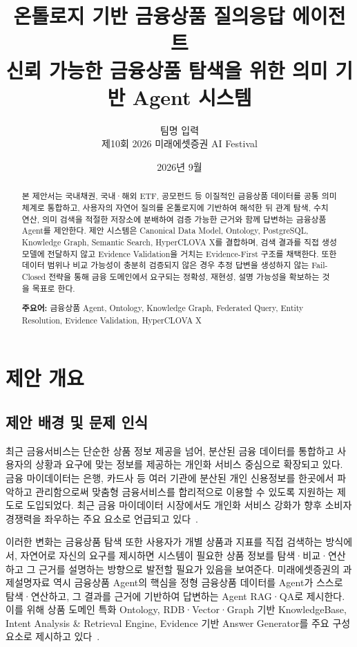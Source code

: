 \documentclass[11pt,a4paper]{article}
\title{\bfseries 온톨로지 기반 금융상품 질의응답 에이전트\\
\vspace{0.4em}
\large 신뢰 가능한 금융상품 탐색을 위한 의미 기반 Agent 시스템}
\author{
팀명 입력\\
\small 제10회 2026 미래에셋증권 AI Festival
}
\date{2026년 9월}
\begin{document}
\maketitle

\begin{abstract}
본 제안서는 국내채권, 국내·해외 ETF, 공모펀드 등 이질적인 금융상품 데이터를
공통 의미 체계로 통합하고, 사용자의 자연어 질의를 온톨로지에 기반하여 해석한 뒤
관계 탐색, 수치 연산, 의미 검색을 적절한 저장소에 분배하여 검증 가능한 근거와 함께
답변하는 금융상품 Agent를 제안한다. 제안 시스템은 Canonical Data Model,
Ontology, PostgreSQL, Knowledge Graph, Semantic Search, HyperCLOVA X를 결합하며,
검색 결과를 직접 생성 모델에 전달하지 않고 Evidence Validation을 거치는
Evidence-First 구조를 채택한다. 또한 데이터 범위나 비교 가능성이 충분히 검증되지 않은
경우 추정 답변을 생성하지 않는 Fail-Closed 전략을 통해 금융 도메인에서 요구되는
정확성, 재현성, 설명 가능성을 확보하는 것을 목표로 한다.

\medskip
\noindent\textbf{주요어:} 금융상품 Agent, Ontology, Knowledge Graph, Federated Query,
Entity Resolution, Evidence Validation, HyperCLOVA X
\end{abstract}

\clearpage
\tableofcontents
\clearpage

\section{제안 개요}

\subsection{제안 배경 및 문제 인식}

최근 금융서비스는 단순한 상품 정보 제공을 넘어,
분산된 금융 데이터를 통합하고 사용자의 상황과 요구에 맞는 정보를 제공하는
개인화 서비스 중심으로 확장되고 있다.
금융 마이데이터는 은행, 카드사 등 여러 기관에 분산된 개인 신용정보를
한곳에서 파악하고 관리함으로써 맞춤형 금융서비스를 합리적으로 이용할 수 있도록
지원하는 제도로 도입되었다.
최근 금융 마이데이터 시장에서도 개인화 서비스 강화가
향후 소비자 경쟁력을 좌우하는 주요 요소로 언급되고 있다~\cite{bigdata-mydata}.

이러한 변화는 금융상품 탐색 또한
사용자가 개별 상품과 지표를 직접 검색하는 방식에서,
자연어로 자신의 요구를 제시하면 시스템이 필요한 상품 정보를
탐색·비교·연산하고 그 근거를 설명하는 방향으로 발전할 필요가 있음을 보여준다.
미래에셋증권의 과제설명자료 역시 금융상품 Agent의 핵심을
정형 금융상품 데이터를 Agent가 스스로 탐색·연산하고,
그 결과를 근거에 기반하여 답변하는 Agent RAG·QA로 제시한다.
이를 위해 상품 도메인 특화 Ontology,
RDB·Vector·Graph 기반 KnowledgeBase,
Intent Analysis \& Retrieval Engine,
Evidence 기반 Answer Generator를 주요 구성요소로 제시하고 있다~\cite[4쪽]{mirae-task}.
\end{document}
